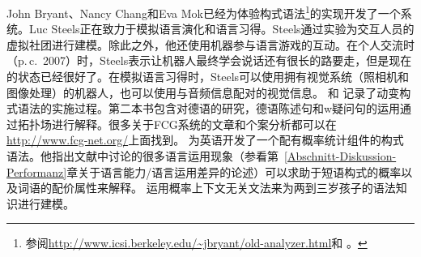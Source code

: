John Bryant、Nancy Chang和Eva Mok已经为体验构式语法\footnote{%
  参阅\url{http://www.icsi.berkeley.edu/~jbryant/old-analyzer.html}和 。
}的实现开发了一个系统。Luc Steels正在致力于模拟语言演化和语言习得\citep{Steels2003a}。Steels通过实验为交互人员的虚拟社团进行建模。除此之外，他还使用机器参与语言游戏的互动\citep{Steels2015a-u}。在个人交流时（p.\,c.\ 2007）时，Steels表示让机器人最终学会说话还有很长的路要走，但是现在的状态已经很好了。在模拟语言习得时，Steels可以使用拥有视觉系统（照相机和图像处理）的机器人，也可以使用与音频信息配对的视觉信息。 和 记录了动变构式语法的实施过程。第二本书包含对德语的研究，德语陈述句和w疑问句的运用通过拓扑场进行解释\citep{Micelli2012a}。很多关于FCG系统的文章和个案分析都可以在\url{http://www.fcg-net.org/}上面找到。 \citet{Jurafsky96a}为英语开发了一个配有概率统计组件的构式语法。他指出文献中讨论的很多语言运用现象（参看第~\ref{Abschnitt-Diskussion-Performanz}章关于语言能力/语言运用差异的论述）可以求助于短语构式的概率以及词语的配价属性来解释。 \citet*{BLT2009a}运用概率上下文无关文法来为两到三岁孩子的语法知识进行建模。
